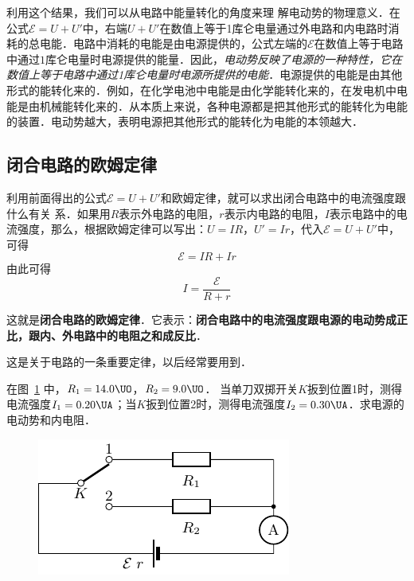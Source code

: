 利用这个结果，我们可以从电路中能量转化的角度来理
解电动势的物理意义．在公式$\mathcal{E}=U+U'$中，右端$U+U'$在数值上等于1库仑电量通过外电路和内电路时消耗的总电能．电路中消耗的电能是由电源提供的，公式左端的$\mathcal{E}$在数值上等于电路中通过$1$库仑电量时电源提供的能量．因此，\textit{电动势反映了电源的一种特性，它在数值上等于电路中通过1库仑电量时电源所提供的电能}．电源提供的电能是由其他形式的能转化来的．例如，在化学电池中电能是由化学能转化来的，在发电机中电能是由机械能转化来的．从本质上来说，各种电源都是把其他形式的能转化为电能的装置．电动势越大，表明电源把其他形式的能转化为电能的本领越大．

\subsection{闭合电路的欧姆定律}

利用前面得出的公式$\mathcal{E}=U+U'$和欧姆定律，就可以求出闭合电路中的电流强度跟什么有关
系．如果用$R$表示外电路的电阻，$r$表示内电路的电阻，$I$表示电路中的电流强度，那么，根据欧姆定律可以写出：$U=IR$，$U'=Ir$，代入$\mathcal{E}=U+U'$中，可得
\[\mathcal{E}=IR+Ir \]
由此可得
\[I=\frac{\mathcal{E}}{R+r} \]

这就是\textbf{闭合电路的欧姆定律}．它表示：\textbf{闭合电路中的电流强度跟电源的电动势成正比，跟内、外电路中的电阻之和成反比}．

这是关于电路的一条重要定律，以后经常要用到．

\begin{example}
在图~\ref{fig_B_7-27} 中，$R_1=14.0 \UO$，$R_2=9.0 \UO$．
当单刀双掷开关$K$扳到位置1时，测得电流强度$I_1=0.20\UA $；当$K$扳到位置2时，测得电流强度$I_2=0.30\UA $．求电源的电动势和内电阻．
\end{example}
\begin{figure}[htbp]
    \centering
    \includegraphics{fig/B/7-27.pdf}
    \caption{}\label{fig_B_7-27}
\end{figure}

